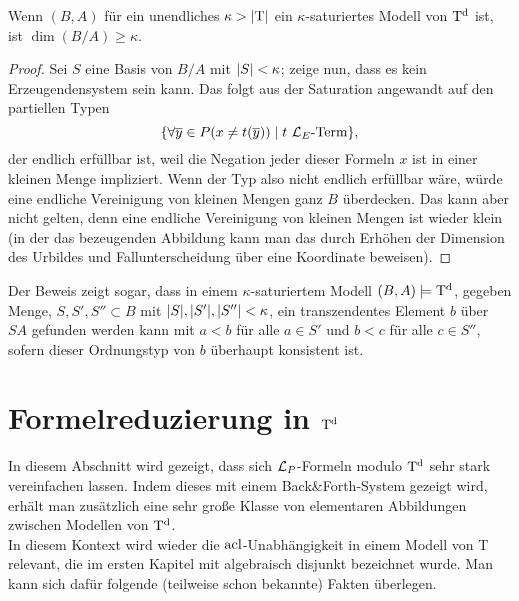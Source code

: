 \begin{lemma}
	Wenn $(B,A)$ für ein unendliches $\kappa>{\left| \operatorname{T} \right|}$ ein $\kappa$-saturiertes Modell von $\operatorname{T^d}$ ist, ist $\dim(B/A)\geq\kappa$.
\end{lemma}
\begin{proof}
	Sei $S$ eine Basis von $B/A$ mit ${\left| S \right|}<\kappa$; zeige nun, dass es kein Erzeugendensystem sein kann. Das folgt aus der Saturation angewandt auf den partiellen Typen $$\{\forall\overline{y}\in P(x\neq t(\overline{y}))\mid t\ \mathcal{L}_E\text{-Term}\},$$ der endlich erfüllbar ist, weil die Negation jeder dieser Formeln \glqq{}$x$ ist in einer kleinen Menge\grqq{} impliziert. Wenn der Typ also nicht endlich erfüllbar wäre, würde eine endliche Vereinigung von kleinen Mengen ganz $B$ überdecken. Das kann aber nicht gelten, denn eine endliche Vereinigung von kleinen Mengen ist wieder klein (in der das bezeugenden Abbildung kann man das durch Erhöhen der Dimension des Urbildes und Fallunterscheidung über eine Koordinate beweisen).
\end{proof}
\newpage
\begin{corollary}\label{Finden transz Elte}
	Der Beweis zeigt sogar, dass in einem $\kappa$-saturiertem Modell $(B,A)\models\operatorname{T^d}$, gegeben Menge, $S,S',S''\subset B$ mit ${\left| S \right|},{\left| S' \right|},{\left| S'' \right|}<\kappa$, ein transzendentes Element $b$ über $SA$ gefunden werden kann mit $a<b$ für alle $a\in S'$ und $b<c$ für alle $c\in S''$, sofern dieser Ordnungstyp von $b$ überhaupt konsistent ist.
\end{corollary}

\section{Formelreduzierung in $\operatorname{T^d}$}
In diesem Abschnitt wird gezeigt, dass sich $\mathcal{L}_P$-Formeln modulo $\operatorname{T^d}$ sehr stark vereinfachen lassen. Indem dieses mit einem Back\&Forth-System gezeigt wird, erhält man zusätzlich eine sehr große Klasse von elementaren Abbildungen zwischen Modellen von $\operatorname{T^d}$.\\
In diesem Kontext wird wieder die $\operatorname{acl}$-Unabhängigkeit in einem Modell von T relevant, die im ersten Kapitel mit \glqq{}algebraisch disjunkt\grqq{} bezeichnet wurde. Man kann sich dafür folgende (teilweise schon bekannte) Fakten überlegen.

